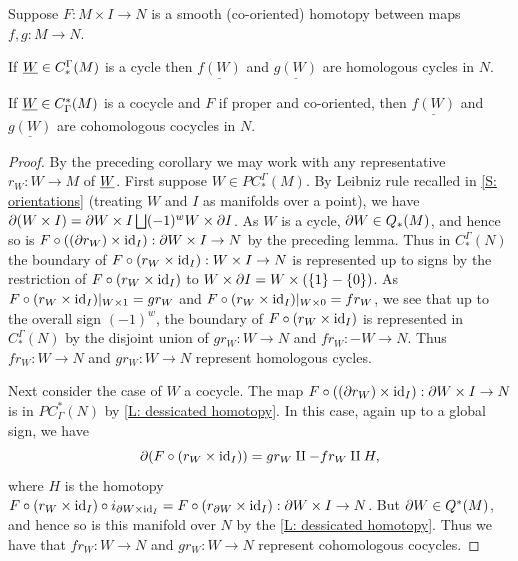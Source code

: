 \begin{corollary}\label{C: homotopy}
Suppose $F : M \times I \to N$ is a smooth (co-oriented) homotopy between maps $f,g \colon M \to N$.

If $\underline{W} \in C_*^\Gamma(M)$ is a cycle then $\underline{f(W)}$ and $\underline{g(W)}$ are homologous cycles in $N$.

If $\underline{W} \in C^*_\Gamma(M)$ is a cocycle and $F$ if proper and co-oriented, then $\underline{f(W)}$ and $\underline{g(W)}$ are cohomologous cocycles in $N$.
\end{corollary}
\begin{proof}
By the preceding corollary we may work with any representative $r_W \colon W \to M$ of $\underline{W}$. First suppose $W \in PC_*^\Gamma(M)$. By Leibniz rule recalled in \cref{S: orientations} (treating $W$ and $I$ as manifolds over a point), we have $\partial (W \times I) = \partial W \times I \bigsqcup (-1)^{w} W \times \partial I$. As $W$ is a cycle, $\partial W \in Q_*(M)$, and hence so is $F\circ ((\partial r_W) \times \mathrm{id}_I):\partial W \times I \to N$ by the preceding lemma. Thus in $C^\Gamma_*(N)$ the boundary of $F\circ (r_W \times \mathrm{id}_I):W \times I \to N$ is represented up to signs by the restriction of
$F\circ (r_W \times \mathrm{id}_I)$ to $W \times \partial I = W \times (\{1\}-\{0\})$. As $F\circ (r_W \times \mathrm{id}_I)|_{W \times 1} = gr_W$ and $F\circ (r_W \times \mathrm{id}_I)|_{W \times 0} = fr_W$, we see that up to the overall sign $(-1)^{w}$, the boundary of $F\circ (r_W \times \mathrm{id}_I)$ is represented in $C_*^\Gamma(N)$ by the disjoint union of $gr_W \colon W \to N$ and $fr_W:-W \to N$. Thus $fr_W \colon W \to N$ and $gr_W \colon W \to N$ represent homologous cycles.

Next consider the case of $W$ a cocycle. The map $F\circ ((\partial r_W) \times \mathrm{id}_I):\partial W \times I \to N$ is in $PC^*_\Gamma(N)$ by \cref{L: dessicated homotopy}.
 In this case, again up to a global sign, we have $$\partial (F\circ (r_W \times \mathrm{id}_I)) = gr_W \amalg -fr_W \amalg H,$$ where $H$ is the homotopy $F\circ (r_W \times \mathrm{id}_I)\circ i_{\partial W \times \mathrm{id}_I} = F\circ (r_{\partial W} \times \mathrm{id}_I):\partial W \times I \to N$. But $\partial W \in Q^*(M)$, and hence so is this manifold over $N$ by the \cref{L: dessicated homotopy}. Thus we have
that $fr_W \colon W \to N$ and $gr_W \colon W \to N$ represent cohomologous cocycles.
\end{proof}





